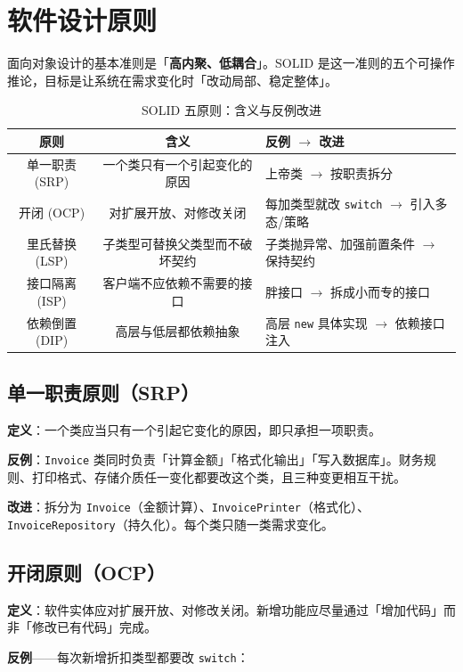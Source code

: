 \section{软件设计原则}

面向对象设计的基本准则是「\textbf{高内聚、低耦合}」。SOLID 是这一准则的五个可操作推论，目标是让系统在需求变化时「改动局部、稳定整体」。

\begin{table}[H]
\centering
\caption{SOLID 五原则：含义与反例改进}
\begin{tabulary}{\textwidth}{CCL}
\toprule
原则 & 含义 & 反例 $\to$ 改进 \\
\midrule
单一职责 (SRP) & 一个类只有一个引起变化的原因 & 上帝类 $\to$ 按职责拆分 \\
开闭 (OCP) & 对扩展开放、对修改关闭 & 每加类型就改 \texttt{switch} $\to$ 引入多态/策略 \\
里氏替换 (LSP) & 子类型可替换父类型而不破坏契约 & 子类抛异常、加强前置条件 $\to$ 保持契约 \\
接口隔离 (ISP) & 客户端不应依赖不需要的接口 & 胖接口 $\to$ 拆成小而专的接口 \\
依赖倒置 (DIP) & 高层与低层都依赖抽象 & 高层 \texttt{new} 具体实现 $\to$ 依赖接口注入 \\
\bottomrule
\end{tabulary}
\end{table}

\subsection{单一职责原则（SRP）}

\textbf{定义}：一个类应当只有一个引起它变化的原因，即只承担一项职责。

\textbf{反例}：\texttt{Invoice} 类同时负责「计算金额」「格式化输出」「写入数据库」。财务规则、打印格式、存储介质任一变化都要改这个类，且三种变更相互干扰。

\textbf{改进}：拆分为 \texttt{Invoice}（金额计算）、\texttt{InvoicePrinter}（格式化）、\texttt{InvoiceRepository}（持久化）。每个类只随一类需求变化。

\subsection{开闭原则（OCP）}

\textbf{定义}：软件实体应对扩展开放、对修改关闭。新增功能应尽量通过「增加代码」而非「修改已有代码」完成。

\textbf{反例}——每次新增折扣类型都要改 \texttt{switch}：

